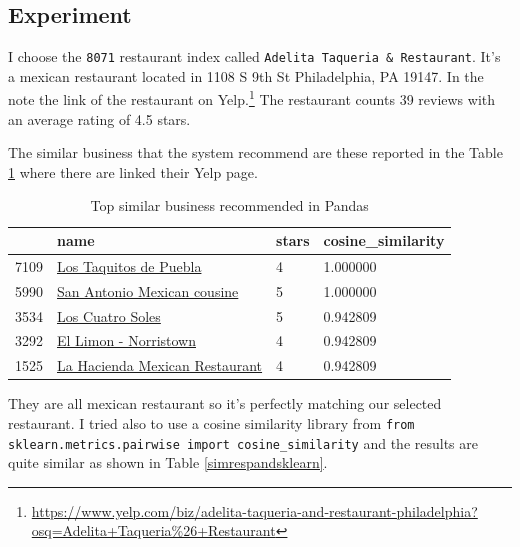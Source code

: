 \documentclass[12pt,english]{report}
\begin{document}
\subsection{Experiment}
I choose the \texttt{8071} restaurant index called \texttt{Adelita Taqueria \& Restaurant}.
It's a mexican restaurant located in 1108 S 9th St Philadelphia, PA 19147. In the note the link of the restaurant on Yelp.\footnote{\url{https://www.yelp.com/biz/adelita-taqueria-and-restaurant-philadelphia?osq=Adelita+Taqueria\%26+Restaurant}}
The restaurant counts 39 reviews with an average rating of 4.5 stars.\par
The similar business that the system recommend are these reported in the Table \ref{simrespand} where there are linked their Yelp page.
\begin{table}[]
\caption{Top similar business recommended in Pandas}
\label{simrespand}
\begin{tabular}{|l|l|l|l|}
\hline
     & name                           & stars & cosine\_similarity \\ \hline
7109 & \href{https://www.yelp.com/biz/los-taquitos-de-puebla-philadelphia-4?osq=Los+Taquitos+de+Puebla}{Los Taquitos de Puebla}         & 4     & 1.000000           \\ \hline
5990 & \href{https://www.yelp.com/biz/san-antonio-mexican-cousine-hatfield?osq=San+Antonio+Mexican+cousine}{San Antonio Mexican cousine}    & 5     & 1.000000           \\ \hline
3534 & \href{https://www.yelp.com/biz/los-cuatro-soles-philadelphia?osq=Los+Cuatro+Soles}{Los Cuatro Soles}              & 5     & 0.942809           \\ \hline
3292 & \href{https://www.yelp.com/biz/ecowas-african-restaurant-philadelphia-2}{El Limon - Norristown}          & 4     & 0.942809           \\ \hline
1525 & \href{https://www.yelp.com/biz/la-hacienda-mexican-restaurant-bensalem?osq=La+Hacienda+Mexican+Restaurant}{La Hacienda Mexican Restaurant} & 4     & 0.942809           \\ \hline
\end{tabular}
\end{table}
They are all mexican restaurant so it's perfectly matching our selected restaurant.
I tried also to use a cosine similarity library from \texttt{from sklearn.metrics.pairwise import cosine\_similarity} and the results are quite similar as shown in Table \ref{simrespandsklearn}.
\end{document}
